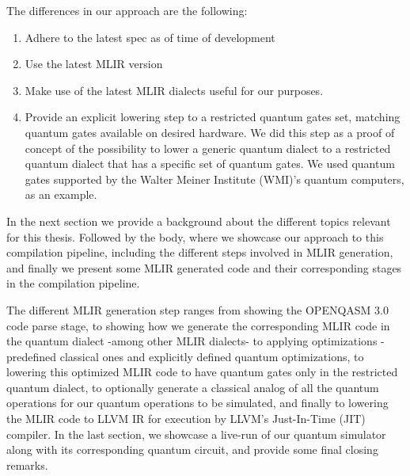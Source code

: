 The differences in our approach are the following:
\begin{enumerate}
    \item Adhere to the latest spec as of time of development
    \item Use the latest MLIR version
    \item Make use of the latest MLIR dialects useful for our purposes. 
    \item Provide an explicit lowering step to a restricted quantum gates set, matching quantum gates
    available on desired hardware. We did this step as a proof of concept of the possibility to lower a generic quantum dialect
    to a restricted quantum dialect that has a specific set of quantum gates. We used quantum gates
    supported by the Walter Meiner Institute (WMI)'s quantum computers, as an example.
\end{enumerate}

In the next section we provide a background about the different topics relevant for this thesis. 
Followed by the body, where we showcase our approach to this
compilation pipeline, including the different steps involved in MLIR generation,
and finally we present some MLIR generated code and their corresponding stages in the compilation pipeline.

The different  MLIR generation step ranges 
from  showing the OPENQASM 3.0 code parse stage, to showing how we generate the corresponding
MLIR code in the quantum dialect -among other MLIR dialects- 
to applying optimizations - predefined classical ones and explicitly defined quantum optimizations,
to lowering this optimized MLIR code to have quantum gates only in the restricted quantum dialect,
to optionally generate a classical analog of all the quantum operations for our 
quantum operations to be simulated, and finally to lowering the MLIR code to LLVM IR for execution
by LLVM's Just-In-Time (JIT) compiler.
In the last section, we showcase a live-run of our quantum simulator along with its corresponding
quantum circuit, and provide some final closing remarks.

